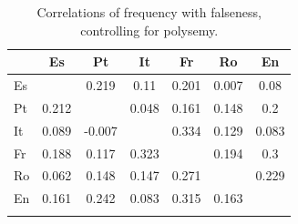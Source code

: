 \documentclass[output=paper]{langsci/langscibook}
\begin{document}
\begin{table}[p]
    \begin{tabular}{l  *{6}{S[table-format=-1.3]} }
    \lsptoprule
        &  {Es} & {Pt} & {It} & {Fr} & {Ro} & {En} \\ \midrule
        Es &  & 0.219 & 0.11 & 0.201 & 0.007 & 0.08 \\
        Pt & 0.212 &  & 0.048 & 0.161 & 0.148 & 0.2 \\
        It & 0.089 & -0.007 &  & 0.334 & 0.129 & 0.083 \\
        Fr & 0.188 & 0.117 & 0.323 &  & 0.194 & 0.3 \\
        Ro & 0.062 & 0.148 & 0.147 & 0.271 &  & 0.229 \\
        En & 0.161 & 0.242 & 0.083 & 0.315 & 0.163 &  \\
        \lspbottomrule
    \end{tabular}
    \caption{Correlations of frequency with falseness, controlling for polysemy.\label{tab:freq-corr}}
\end{table}
\end{document}

